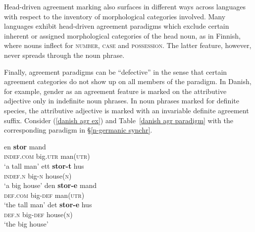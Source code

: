 Head\hyp{}driven agreement marking also surfaces in different ways across languages with respect to the inventory of morphological categories involved. Many languages exhibit head\hyp{}driven agreement paradigms which exclude certain inherent or assigned morphological categories of the head noun, as in Finnish, where nouns inflect for \textsc{number}, \textsc{case} and \textsc{possession}. The latter feature, however, never spreads through the noun phrase.
\begin{exe}
\ex
{}
\begin{xlist}
\end{xlist}
\end{exe}
Finally, agreement paradigms can be “defective” in the sense that certain agreement categories do not show up on all members of the paradigm. In Danish, for example, gender as an agreement feature is marked on the attributive adjective only in indefinite noun phrases. In noun phrases marked for definite species, the attributive adjective is marked with an invariable definite agreement suffix. Consider (\ref{danish agr ex}) and Table~\ref{danish agr paradigm} with the corresponding paradigm in \S\ref{n-germanic synchr}.
\begin{exe}
\ex
\label{danish agr ex}
\begin{xlist}
\ex
\gll en \textbf{stor} mand\\
	\textsc{indef.com} big.\textsc{utr} man(\textsc{utr})\\
\glt	‘a tall man’
\ex
\gll ett \textbf{stor-t} hus\\
	\textsc{indef.n} big-\textsc{n} house(\textsc{n})\\
\glt	‘a big house’
\ex	
\gll den \textbf{stor-e} mand\\
	\textsc{def.com} big-\textsc{def} man(\textsc{utr})\\
\glt	‘the tall man’
\ex
\gll det \textbf{stor-e} hus\\
	\textsc{def.n} big-\textsc{def} house(\textsc{n})\\
\glt	‘the big house’
\end{xlist}
\end{exe}
